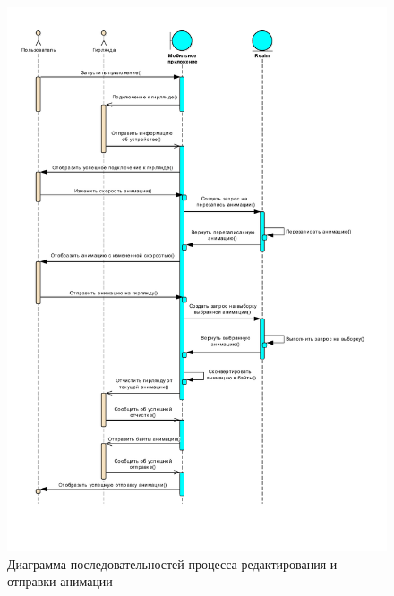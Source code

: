 \label{app:sequence}

~
\begin{figure}[H]
\centering
	\includegraphics[scale=0.8]{figures/uml_sequence.pdf}
	\caption{Диаграмма последовательностей процесса редактирования и отправки анимации}
	\label{fig:appendices:sequence}
\end{figure}